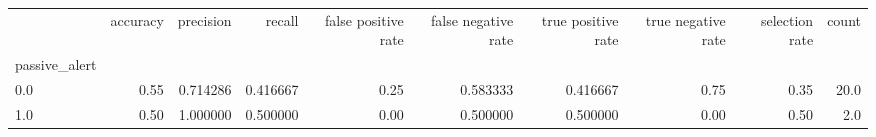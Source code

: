 \begin{tabular}{lrrrrrrrrr}
\toprule
{} &  accuracy &  precision &    recall &  false positive rate &  false negative rate &  true positive rate &  true negative rate &  selection rate &  count \\
passive\_alert &           &            &           &                      &                      &                     &                     &                 &        \\
\midrule
0.0           &      0.55 &   0.714286 &  0.416667 &                 0.25 &             0.583333 &            0.416667 &                0.75 &            0.35 &   20.0 \\
1.0           &      0.50 &   1.000000 &  0.500000 &                 0.00 &             0.500000 &            0.500000 &                0.00 &            0.50 &    2.0 \\
\bottomrule
\end{tabular}
